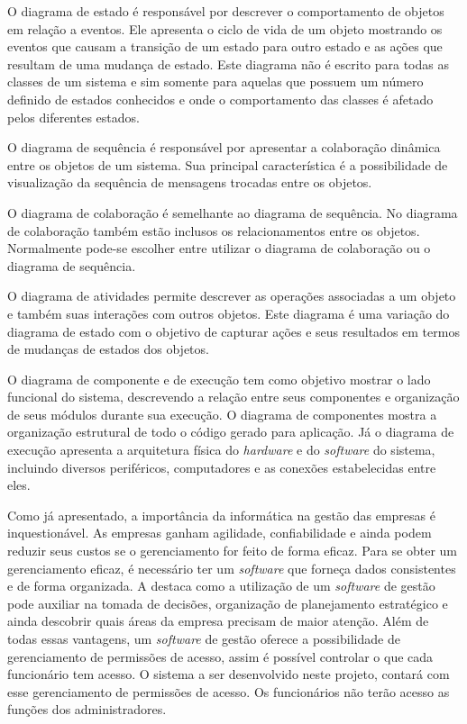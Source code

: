 O diagrama de estado é responsável por descrever o comportamento de objetos em relação a eventos. Ele apresenta o ciclo de vida de um objeto 
mostrando os eventos que causam a transição de um estado para outro estado e as ações que resultam de uma mudança de estado. Este diagrama
não é escrito para todas as classes de um sistema e sim somente para aquelas que possuem um número definido de estados conhecidos e onde o 
comportamento das classes é afetado pelos diferentes estados.

O diagrama de sequência é responsável por apresentar a colaboração dinâmica entre os objetos de um sistema. Sua principal característica é 
a possibilidade de visualização da sequência de mensagens trocadas entre os objetos.

O diagrama de colaboração é semelhante ao diagrama de sequência. No diagrama de colaboração também estão inclusos os relacionamentos entre
os objetos. Normalmente pode-se escolher entre utilizar o diagrama de colaboração ou o diagrama de sequência.

O diagrama de atividades permite descrever as operações associadas a um objeto e também suas interações com outros objetos. Este diagrama 
é uma variação do diagrama de estado com o objetivo de capturar ações e seus resultados em termos de mudanças de estados dos objetos. 

O diagrama de componente e de execução tem como objetivo mostrar o lado funcional do sistema, descrevendo a relação entre seus componentes 
e organização de seus módulos durante sua execução. O diagrama de componentes mostra a organização estrutural de todo o código gerado para
aplicação. Já o diagrama de execução apresenta a arquitetura física do \textit{hardware} e do \textit{software} do sistema, incluindo diversos periféricos, 
computadores e as conexões estabelecidas entre eles.

Como já apresentado, a importância da informática na gestão das empresas é inquestionável. As
empresas ganham agilidade, confiabilidade e ainda podem reduzir seus custos se o
gerenciamento for feito de forma eficaz. Para se obter um gerenciamento eficaz, é necessário
ter um \textit{software} que forneça dados consistentes e de forma organizada. A \cite{sbsistemas2015}
destaca como a utilização de um \textit{software} de gestão pode auxiliar na tomada de decisões,
organização de planejamento estratégico e ainda descobrir quais áreas da empresa precisam de
maior atenção. Além de todas essas vantagens, um \textit{software} de gestão oferece a possibilidade
de gerenciamento de permissões de acesso, assim é possível controlar o que cada funcionário 
tem acesso. O sistema a ser desenvolvido neste projeto, contará com esse gerenciamento de
permissões de acesso. Os funcionários não terão acesso as funções dos administradores.

